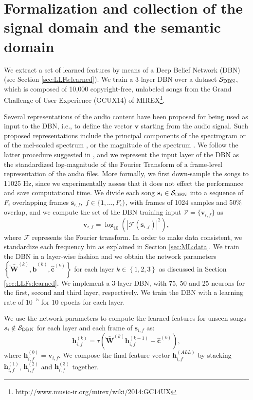\section{Formalization and collection of the signal domain and the semantic domain}\label{sec:MSA:domains}
We extract a set of learned features by means of a Deep Belief Network (DBN) (see Section \ref{sec:LLFs:learned}). We train a 3-layer DBN over a dataset $\mathcal{S}_\text{DBN}$, which is composed of 10,000 copyright-free, unlabeled songs from the Grand Challenge of User Experience (GCUX14) of MIREX\footnote{http://www.music-ir.org/mirex/wiki/2014:GC14UX}. 

Several representations of the audio content have been proposed for being used as input to the DBN, i.e., to define the vector $\mathbf{v}$ starting from the audio signal. Such proposed representations include the principal components of the spectrogram \cite{lee2009convolutional} or of the mel-scaled spectrum \cite{hamel2011}, or the magnitude of the spectrum \cite{Hamel2010}. We follow the latter procedure suggested in \cite{Hamel2010}, and we represent the input layer of the DBN as the standardized log-magnitude of the Fourier Transform of a frame-level representation of the audio files. More formally, we first down-sample the songs to 11025 Hz, since we experimentally assess that it does not effect the performance and save computational time. We divide each song $\mathbf{s}_i \in \mathcal{S}_\text{DBN}$ into a sequence of $F_i$ overlapping frames $\mathbf{s}_{i,f}, \; f\in\{1, ..., F_i\}$, with frames of 1024 samples and 50\% overlap, and we compute the set of the DBN training input $\mathcal{V}=\{\mathbf{v}_{i,f}\}$ as  
\begin{equation}
\mathbf{v}_{i,f} = \log_{10}(| \mathcal{F}(\mathbf{s}_{i,f}) |^2),
\end{equation}
where $\mathcal{F}$ represents the Fourier transform. In order to make data consistent, we standardize each frequency bin as explained in Section \ref{sec:ML:data}. We train the DBN in a layer-wise fashion and we obtain the network parameters  $\left\{\mathbf{\hat{W}}^{(k)},\mathbf{\hat{b}}^{(k)},\mathbf{\hat{c}}^{(k)} \right\}$ for each layer $k \in  \left\{1,2,3\right\}$ as discussed in Section \ref{sec:LLFs:learned}. We implement a 3-layer DBN, with 75, 50 and 25 neurons for the first, second and third layer, respectively. We train the DBN with a learning rate of $10^{-5}$ for $10$ epochs \cite{Bengio2009} for each layer. 

We use the network parameters to compute the learned features for unseen songs $s_{i} \notin \mathcal{S}_\text{DBN}$ for each layer and each frame of  $\mathbf{s}_{i,f}$ as: 
\begin{equation}
\mathbf{h}^{(k)}_{i,f} = \tau ( \hat{\mathbf{W}}^{(k)} \mathbf{h}^{(k-1)}_{i,f}+ \hat{\mathbf{c}}^{(k)}),
\end{equation}
where $\mathbf{h}^{(0)}_{i,f}=\mathbf{v}_{i,f}$. We compose the final feature vector $\mathbf{h}^{(ALL)}_{i,f}$ by stacking $\mathbf{h}^{(1)}_{i,f}$, $\mathbf{h}^{(2)}_{i,f}$ and $\mathbf{h}^{(3)}_{i,f}$ together.

